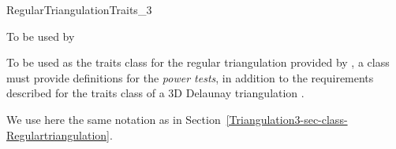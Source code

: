 

\begin{ccRefConcept}{RegularTriangulationTraits_3}

To be used by \protect 
{}

\ccDefinition

To be used as the traits class for the regular triangulation provided
by \cgal, a class must provide definitions for the \textit{power
tests},
in addition to the requirements described for the traits class of a 3D 
Delaunay triangulation .

We use here the same notation as in
Section~\ref{Triangulation3-sec-class-Regulartriangulation}. 


\end{ccRefConcept}
